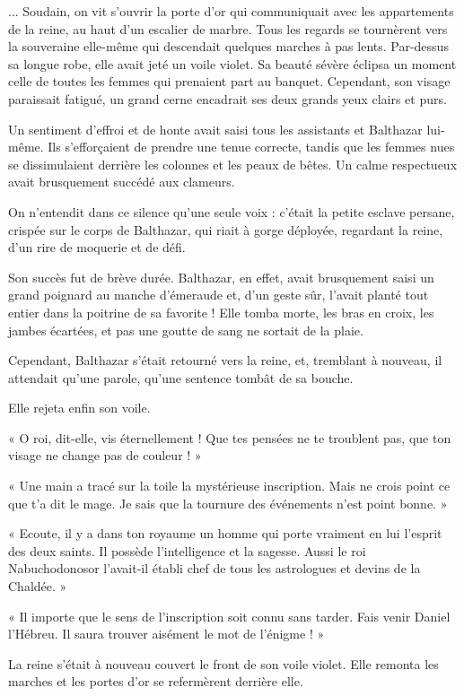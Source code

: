 \documentclass[a4paper, 11pt, oneside, polutonikogreek, french]{article}
\begin{document}
... Soudain, on vit s'ouvrir la porte d'or qui communiquait avec les appartements de la reine, au haut d'un escalier de marbre. Tous les regards se tournèrent vers la souveraine elle-même qui descendait quelques marches à pas lents. Par-dessus sa longue robe, elle avait jeté un voile violet. Sa beauté sévère éclipsa un moment celle de toutes les femmes qui prenaient part au banquet. Cependant, son visage paraissait fatigué, un grand cerne encadrait ses deux grands yeux clairs et purs.

Un sentiment d'effroi et de honte avait saisi tous les assistants et Balthazar lui-même. Ils s'efforçaient de prendre une tenue correcte, tandis que les femmes nues se dissimulaient derrière les colonnes et les peaux de bêtes. Un calme respectueux avait brusquement succédé aux clameurs.

On n'entendit dans ce silence qu'une seule voix : c'était la petite esclave persane, crispée sur le corps de Balthazar, qui riait à gorge déployée, regardant la reine, d'un rire de moquerie et de défi.

Son succès fut de brève durée. Balthazar, en effet, avait brusquement saisi un grand poignard au manche d'émeraude et, d'un geste sûr, l'avait planté tout entier dans la poitrine de sa favorite ! Elle tomba morte, les bras en croix, les jambes écartées, et pas une goutte de sang ne sortait de la plaie.

Cependant, Balthazar s'était retourné vers la reine, et, tremblant à nouveau, il attendait qu'une parole, qu'une sentence tombât de sa bouche.

Elle rejeta enfin son voile.

« O roi, dit-elle, vis éternellement ! Que tes pensées ne te troublent pas, que ton visage ne change pas de couleur ! »

« Une main a tracé sur la toile la mystérieuse inscription. Mais ne crois point ce que t'a dit le mage. Je sais que la tournure des événements n'est point bonne. »

« Ecoute, il y a dans ton royaume un homme qui porte vraiment en lui l'esprit des deux saints. Il possède l'intelligence et la sagesse. Aussi le roi Nabuchodonosor l'avait-il établi chef de tous les astrologues et devins de la Chaldée. »

« Il importe que le sens de l'inscription soit connu sans tarder. Fais venir Daniel l'Hébreu. Il saura trouver aisément le mot de l'énigme ! »

La reine s'était à nouveau couvert le front de son voile violet. Elle remonta les marches et les portes d'or se refermèrent derrière elle.
\end{document}
